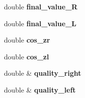 \begin{DoxyCompactItemize}
\item 
double {\bfseries final\+\_\+value\+\_\+R}\label{classGraspComputation_a7e6cc9e8ace1461121684bcf4c58e3b2}

\item 
double {\bfseries final\+\_\+value\+\_\+L}\label{classGraspComputation_a1a54cde3bbdd7d348f70b3e5ccfaf563}

\item 
double {\bfseries cos\+\_\+zr}\label{classGraspComputation_ac4b645e6f6d6518e933dde2a1c71b126}

\item 
double {\bfseries cos\+\_\+zl}\label{classGraspComputation_ad6f8257369925e1676f53949717d37d6}

\item 
double \& {\bfseries quality\+\_\+right}\label{classGraspComputation_a6977630d0dd9437634e22a3b7d71f126}

\item 
double \& {\bfseries quality\+\_\+left}\label{classGraspComputation_a2915a3ce383d80587f61a06604b2cbcd}

\end{DoxyCompactItemize}
